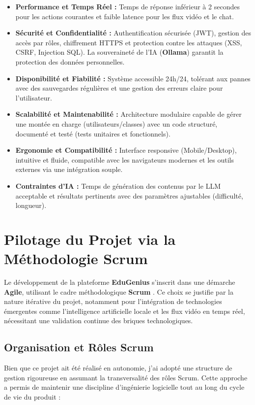\begin{itemize}
    \item \textbf{Performance et Temps Réel :} Temps de réponse inférieur à 2 secondes pour les actions courantes et faible latence pour les flux vidéo et le chat.
    \item \textbf{Sécurité et Confidentialité :} Authentification sécurisée (JWT), gestion des accès par rôles, chiffrement HTTPS et protection contre les attaques (XSS, CSRF, Injection SQL). La souveraineté de l'IA (\textbf{Ollama}) garantit la protection des données personnelles.
    \item \textbf{Disponibilité et Fiabilité :} Système accessible 24h/24, tolérant aux pannes avec des sauvegardes régulières et une gestion des erreurs claire pour l'utilisateur.
    \item \textbf{Scalabilité et Maintenabilité :} Architecture modulaire capable de gérer une montée en charge (utilisateurs/classes) avec un code structuré, documenté et testé (tests unitaires et fonctionnels).
    \item \textbf{Ergonomie et Compatibilité :} Interface responsive (Mobile/Desktop), intuitive et fluide, compatible avec les navigateurs modernes et les outils externes via une intégration souple.
    \item \textbf{Contraintes d'IA :} Temps de génération des contenus par le LLM acceptable et résultats pertinents avec des paramètres ajustables (difficulté, longueur).
\end{itemize}



\section{Pilotage du Projet via la Méthodologie Scrum}

Le développement de la plateforme \textbf{EduGenius} s'inscrit dans une démarche \textbf{Agile}, utilisant le cadre méthodologique \textbf{Scrum} \cite{scrum_guide}. Ce choix se justifie par la nature itérative du projet, notamment pour l'intégration de technologies émergentes comme l'intelligence artificielle locale et les flux vidéo en temps réel, nécessitant une validation continue des briques technologiques.

\subsection{Organisation et Rôles Scrum}
Bien que ce projet ait été réalisé en autonomie, j'ai adopté une structure de gestion rigoureuse en assumant la transversalité des rôles Scrum. Cette approche a permis de maintenir une discipline d'ingénierie logicielle tout au long du cycle de vie du produit :

